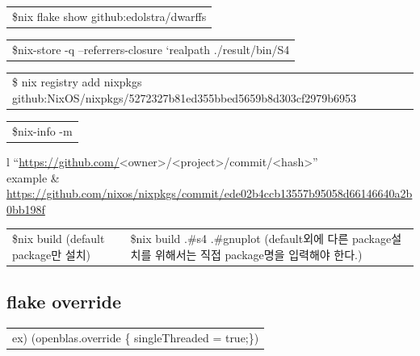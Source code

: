 \documentclass[a4paper,11pt]{article}
\begin{document}
\begin{center}
\begin{tabular}{l}
\$nix flake show github:edolstra/dwarffs\\
\end{tabular}
\end{center}

\begin{center}
\begin{tabular}{l}
\$nix-store -q --referrers-closure `realpath ./result/bin/S4\\
\end{tabular}
\end{center}

\begin{center}
\begin{tabular}{l}
\$ nix registry add nixpkgs github:NixOS/nixpkgs/5272327b81ed355bbed5659b8d303cf2979b6953\\
\end{tabular}
\end{center}

\begin{center}
\begin{tabular}{l}
\$nix-info -m\\
\end{tabular}
\end{center}

\begin{center}
\begin{tabular}{l}
``\url{https://github.com/}<owner>/<project>/commit/<hash>''\\
example & \url{https://github.com/nixos/nixpkgs/commit/ede02b4ccb13557b95058d66146640a2b0bb198f}\\
\end{tabular}
\end{center}

\begin{center}
\begin{tabular}{ll}
\$nix build   (default package만 설치) & \$nix build .\#s4 .\#gnuplot (default외에 다른 package설치를 위해서는 직접 package명을 입력해야 한다.)\\
\end{tabular}
\end{center}

\subsection*{flake override}
\label{sec:org490a9e0}
\begin{center}
\begin{tabular}{l}
ex) (openblas.override \{ singleThreaded = true;\})\\
\end{tabular}
\end{center}
\end{document}
